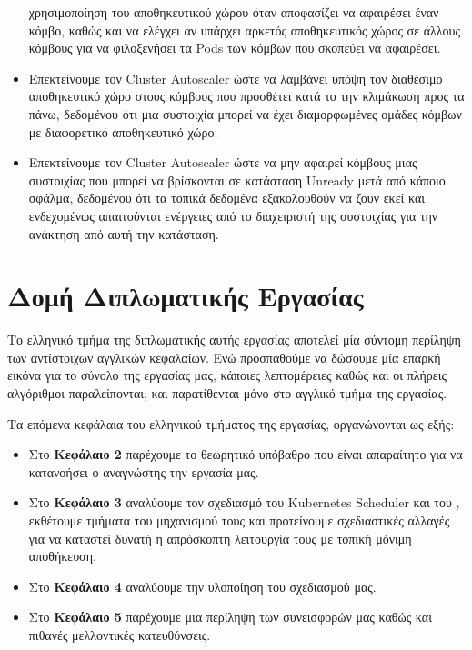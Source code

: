 \begin{itemize}
            χρησιμοποίηση του αποθηκευτικού χώρου όταν αποφασίζει να αφαιρέσει
      έναν κόμβο, καθώς και να ελέγχει αν υπάρχει αρκετός αποθηκευτικός
            χώρος σε άλλους κόμβους για να φιλοξενήσει τα Pods των κόμβων που
            σκοπεύει να αφαιρέσει.
      \item Επεκτείνουμε τον  Cluster Autoscaler ώστε να λαμβάνει υπόψη  τον
            διαθέσιμο αποθηκευτικό χώρο στους κόμβους που προσθέτει κατά το την
            κλιμάκωση προς τα πάνω, δεδομένου ότι μια συστοιχία μπορεί να έχει
            διαμορφωμένες ομάδες κόμβων με διαφορετικό αποθηκευτικό χώρο.
      \item Επεκτείνουμε τον Cluster Autoscaler ώστε να μην αφαιρεί κόμβους μιας
            συστοιχίας που μπορεί να βρίσκονται σε κατάσταση Unready μετά από
            κάποιο σφάλμα, δεδομένου ότι τα τοπικά δεδομένα εξακολουθούν να ζουν
            εκεί και ενδεχομένως απαιτούνται ενέργειες από το διαχειριστή της
            συστοιχίας για την ανάκτηση από αυτή την κατάσταση.
\end{itemize}

\section{Δομή Διπλωματικής Εργασίας} \label{section:gr-intro_outline}

Το ελληνικό τμήμα της διπλωματικής αυτής εργασίας αποτελεί μία σύντομη περίληψη
των αντίστοιχων αγγλικών κεφαλαίων. Ενώ προσπαθούμε να δώσουμε μία επαρκή εικόνα
για το σύνολο της εργασίας μας, κάποιες λεπτομέρειες καθώς και οι πλήρεις
αλγόριθμοι παραλείπονται, και παρατίθενται μόνο στο αγγλικό τμήμα της εργασίας.

Τα επόμενα κεφάλαια του ελληνικού τμήματος της εργασίας, οργανώνονται ως εξής: 

\begin{itemize}
      \item Στο \textbf{Κεφάλαιο 2} παρέχουμε το θεωρητικό υπόβαθρο που είναι
            απαραίτητο για να κατανοήσει ο αναγνώστης την εργασία μας.
      \item Στο \textbf{Κεφάλαιο 3} αναλύουμε τον σχεδιασμό του Kubernetes
            Scheduler και του , εκθέτουμε τμήματα του
            μηχανισμού τους και προτείνουμε σχεδιαστικές αλλαγές για να καταστεί
            δυνατή η απρόσκοπτη λειτουργία τους με τοπική μόνιμη αποθήκευση.
      \item Στο \textbf{Κεφάλαιο 4} αναλύουμε την υλοποίηση του σχεδιασμού μας.
      \item Στο \textbf{Κεφάλαιο 5} παρέχουμε μια περίληψη των συνεισφορών μας
            καθώς και πιθανές μελλοντικές κατευθύνσεις.
\end{itemize}